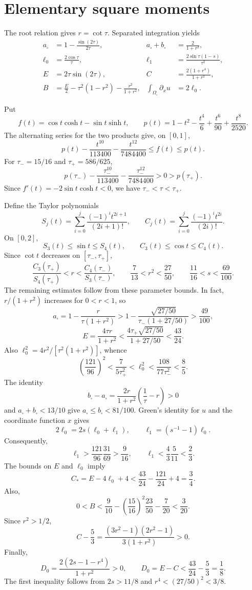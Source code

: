 \documentclass[11pt]{amsart}
\theoremstyle{remark}\newtheorem{remark}[theorem]{Remark}
\numberwithin{equation}{section}
\begin{document}
\appendix
\section{Elementary square moments}\label{app-square}

The root relation gives \(r=\cot\tau\). Separated integration yields
\begin{align*}
a_\square&=1-\frac{\sin(2\tau)}{2\tau},
&a_\square+b_\square&=\frac2{1+r^2},\\
\ell_0&=\frac{2\cos\tau}{\tau},
&\ell_1&=\frac{2\sin\tau(1-s)}{\tau^2},\\
E&=2\tau\sin(2\tau),
&C&=\frac{2(1+r^4)}{1+r^2},\\
B&=\frac E2-\tau^2(1-r^2)-\frac{r^2}{1+r^2},
&\int_{\Omega_\square}\partial_xu&=2\ell_0.
\end{align*}

Put
\[
f(t)=\cos t\cosh t-\sin t\sinh t,\qquad
p(t)=1-t^2-\frac{t^4}{6}+\frac{t^6}{90}+\frac{t^8}{2520}.
\]
The alternating series for the two products give, on \([0,1]\),
\[
p(t)-\frac{t^{10}}{113400}-\frac{t^{12}}{7484400}
\le f(t)\le p(t).
\]
For \(\tau_-=15/16\) and \(\tau_+=586/625\),
\[
p(\tau_-)-\frac{\tau_-^{10}}{113400}
-\frac{\tau_-^{12}}{7484400}>0>p(\tau_+).
\]
Since \(f'(t)=-2\sin t\cosh t<0\), we have
\(\tau_-<\tau<\tau_+\).

Define the Taylor polynomials
\[
S_j(t)=\sum_{i=0}^j\frac{(-1)^it^{2i+1}}{(2i+1)!},\qquad
C_j(t)=\sum_{i=0}^j\frac{(-1)^it^{2i}}{(2i)!}.
\]
On \([0,2]\),
\[
S_3(t)\le\sin t\le S_4(t),\qquad
C_3(t)\le\cos t\le C_4(t).
\]
Since $\cot t$ decreases on $[\tau_-,\tau_+]$,
\[
\frac{C_3(\tau_+)}{S_4(\tau_+)}<r<
\frac{C_4(\tau_-)}{S_3(\tau_-)},\qquad
\frac7{13}<r^2<\frac{27}{50},\qquad
\frac{11}{16}<s<\frac{69}{100}.
\]
The remaining estimates follow from these parameter bounds. In fact,
$r/(1+r^2)$ increases for $0<r<1$, so
\[
a_\square=1-\frac{r}{\tau(1+r^2)}
>1-\frac{\sqrt{27/50}}{\tau_-(1+27/50)}>\frac{49}{100},
\]
\[
E=\frac{4\tau r}{1+r^2}
<\frac{4\tau_+\sqrt{27/50}}{1+27/50}<\frac{43}{24}.
\]
Also $\ell_0^2=4r^2/[\tau^2(1+r^2)]$, whence
\[
\left(\frac{121}{96}\right)^2
<\frac7{5\tau_+^2}<\ell_0^2
<\frac{108}{77\tau_-^2}<\frac85.
\]
The identity
\[
b_\square-a_\square
=\frac{2r}{1+r^2}\left(\frac1\tau-r\right)>0
\]
and \(a_\square+b_\square<13/10\) give
\(a_\square\le b_\square<81/100\).
Green's identity for $u$ and the coordinate function $x$ gives
\[
2\ell_0=2s(\ell_0+\ell_1),\qquad
\ell_1=(s^{-1}-1)\ell_0.
\]
Consequently,
\[
\ell_1>\frac{121}{96}\frac{31}{69}>\frac9{16},\qquad
\ell_1<\frac43\frac5{11}<\frac23.
\]
The bounds on \(E\) and \(\ell_0\) imply
\[
C_*=E-4\ell_0+4<\frac{43}{24}-\frac{121}{24}+4=\frac34.
\]
Also,
\[
0<B<\frac9{10}-\left(\frac{15}{16}\right)^2\frac{23}{50}
-\frac7{20}<\frac3{20}.
\]
Since \(r^2>1/2\),
\[
C-\frac53=
\frac{(3r^2-1)(2r^2-1)}{3(1+r^2)}>0.
\]
Finally,
\[
D_0=\frac{2(2s-1-r^4)}{1+r^2}>0,\qquad
D_0=E-C<\frac{43}{24}-\frac53=\frac18.
\]
The first inequality follows from \(2s>11/8\) and
\(r^4<(27/50)^2<3/8\).
\end{document}
